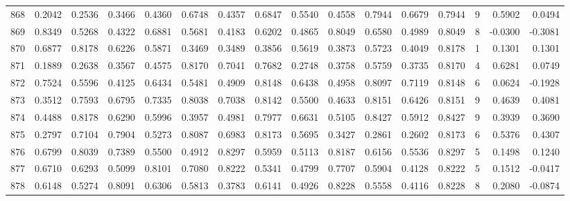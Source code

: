 \begin{tabular}{lrrrrrrrrrrrrrrr}
868 &      0.2042 &  0.2536 &  0.3466 &  0.4360 &  0.6748 &  0.4357 &  0.6847 &  0.5540 &  0.4558 &  0.7944 &   0.6679 &     0.7944 &      9 &                    0.5902 &                     0.0494 \\
869 &      0.8349 &  0.5268 &  0.4322 &  0.6881 &  0.5681 &  0.4183 &  0.6202 &  0.4865 &  0.8049 &  0.6580 &   0.4989 &     0.8049 &      8 &                   -0.0300 &                    -0.3081 \\
870 &      0.6877 &  0.8178 &  0.6226 &  0.5871 &  0.3469 &  0.3489 &  0.3856 &  0.5619 &  0.3873 &  0.5723 &   0.4049 &     0.8178 &      1 &                    0.1301 &                     0.1301 \\
871 &      0.1889 &  0.2638 &  0.3567 &  0.4575 &  0.8170 &  0.7041 &  0.7682 &  0.2748 &  0.3758 &  0.5759 &   0.3735 &     0.8170 &      4 &                    0.6281 &                     0.0749 \\
872 &      0.7524 &  0.5596 &  0.4125 &  0.6434 &  0.5481 &  0.4909 &  0.8148 &  0.6438 &  0.4958 &  0.8097 &   0.7119 &     0.8148 &      6 &                    0.0624 &                    -0.1928 \\
873 &      0.3512 &  0.7593 &  0.6795 &  0.7335 &  0.8038 &  0.7038 &  0.8142 &  0.5500 &  0.4633 &  0.8151 &   0.6426 &     0.8151 &      9 &                    0.4639 &                     0.4081 \\
874 &      0.4488 &  0.8178 &  0.6290 &  0.5996 &  0.3957 &  0.4981 &  0.7977 &  0.6631 &  0.5105 &  0.8427 &   0.5912 &     0.8427 &      9 &                    0.3939 &                     0.3690 \\
875 &      0.2797 &  0.7104 &  0.7904 &  0.5273 &  0.8087 &  0.6983 &  0.8173 &  0.5695 &  0.3427 &  0.2861 &   0.2602 &     0.8173 &      6 &                    0.5376 &                     0.4307 \\
876 &      0.6799 &  0.8039 &  0.7389 &  0.5500 &  0.4912 &  0.8297 &  0.5959 &  0.5113 &  0.8187 &  0.6156 &   0.5536 &     0.8297 &      5 &                    0.1498 &                     0.1240 \\
877 &      0.6710 &  0.6293 &  0.5099 &  0.8101 &  0.7080 &  0.8222 &  0.5341 &  0.4799 &  0.7707 &  0.5904 &   0.4128 &     0.8222 &      5 &                    0.1512 &                    -0.0417 \\
878 &      0.6148 &  0.5274 &  0.8091 &  0.6306 &  0.5813 &  0.3783 &  0.6141 &  0.4926 &  0.8228 &  0.5558 &   0.4116 &     0.8228 &      8 &                    0.2080 &                    -0.0874 \\

\end{tabular}

